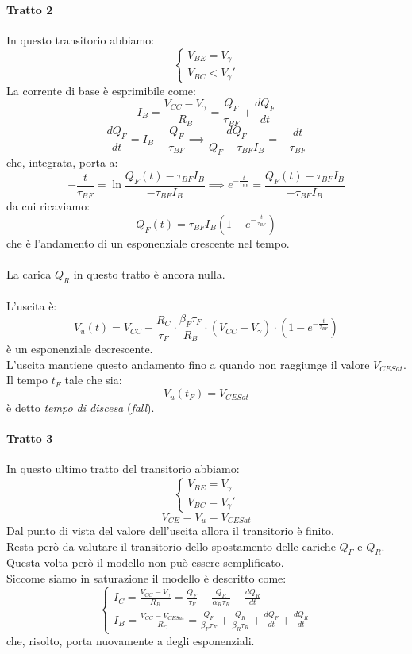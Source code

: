 \documentclass{article}
\numberwithin{equation}{subsection}
\begin{document}
	\paragraph{Tratto 2}\label{par:20.3.3.2}
	In questo transitorio abbiamo:
	\[ \begin{cases} V_{BE} = V_\gamma \\ V_{BC} < V_\gamma' \end{cases} \]
	La corrente di base è esprimibile come:
	\[ I_B = \frac{V_{CC} - V_\gamma}{R_B} = \frac{Q_F}{\tau_{BF}} + \frac{dQ_F}{dt} \]
	\[ \frac{dQ_F}{dt} = I_B - \frac{Q_F}{\tau_{BF}} \implies \frac{dQ_F}{Q_F - \tau_{BF} I_B} = -\frac{dt}{\tau_{BF}} \]
	che, integrata, porta a:
	\[ -\frac{t}{\tau_{BF}} = \ln \frac{Q_F(t) - \tau_{BF} I_B}{-\tau_{BF} I_B} \implies e^{-\frac{t}{\tau_{BF}}} = \frac{Q_F(t) - \tau_{BF} I_B}{-\tau_{BF} I_B} \]
	da cui ricaviamo:
	\[ Q_F(t) = \tau_{BF} I_B \left( 1 - e^{-\frac{t}{\tau_{BF}}} \right) \]
	che è l'andamento di un esponenziale crescente nel tempo.\\\\
	La carica $Q_R$ in questo tratto è ancora nulla.\\\\
	L'uscita è:
	\[ V_u(t) = V_{CC} - \frac{R_C}{\tau_F} \cdot \frac{\beta_F \tau_F}{R_B} \cdot (V_{CC} - V_\gamma) \cdot \left( 1 - e^{-\frac{t}{\tau_{BF}}} \right) \]
	è un esponenziale decrescente.\\
	L'uscita mantiene questo andamento fino a quando non raggiunge il valore $V_{CESat}$.\\
	Il tempo $t_F$ tale che sia:
	\[ V_u(t_F) = V_{CESat} \]
	è detto \textit{tempo di discesa} (\textit{fall}).
	\paragraph{Tratto 3}
	In questo ultimo tratto del transitorio abbiamo:
	\[ \begin{cases} V_{BE} = V_\gamma \\ V_{BC} = V_\gamma' \end{cases} \]
	\[ V_{CE} = V_u = V_{CESat} \]
	Dal punto di vista del valore dell'uscita allora il transitorio è finito.\\
	Resta però da valutare il transitorio dello spostamento delle cariche $Q_F$ e $Q_R$.\\
	Questa volta però il modello non può essere semplificato.\\
	Siccome siamo in saturazione il modello è descritto come:
	\[ \begin{cases} I_C = \frac{V_{CC} - V_\gamma}{R_B} = \frac{Q_F}{\tau_F} - \frac{Q_R}{\alpha_R \tau_R} - \frac{dQ_R}{dt} \\ I_B = \frac{V_{CC} - V_{CESat}}{R_C} = \frac{Q_F}{\beta_F \tau_F} + \frac{Q_R}{\beta_R \tau_R} + \frac{dQ_F}{dt} + \frac{dQ_R}{dt} \end{cases} \]
	che, risolto, porta nuovamente a degli esponenziali.
\end{document}
